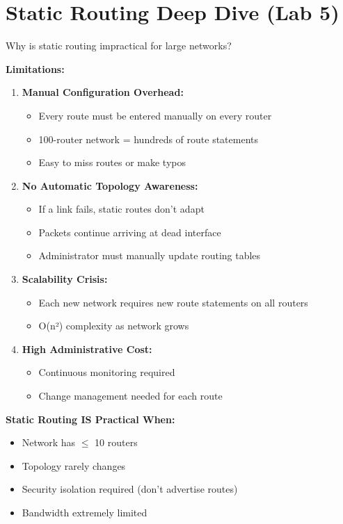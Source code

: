 \documentclass[12pt,a4paper]{article}
\begin{document}
\section{Static Routing Deep Dive (Lab 5)}

\begin{qbox}{Why is static routing impractical for large networks?}
\end{qbox}

\begin{abox}
\textbf{Limitations:}

\begin{enumerate}
    \item \textbf{Manual Configuration Overhead:}
    \begin{itemize}
        \item Every route must be entered manually on every router
        \item 100-router network = hundreds of route statements
        \item Easy to miss routes or make typos
    \end{itemize}

    \item \textbf{No Automatic Topology Awareness:}
    \begin{itemize}
        \item If a link fails, static routes don't adapt
        \item Packets continue arriving at dead interface
        \item Administrator must manually update routing tables
    \end{itemize}

    \item \textbf{Scalability Crisis:}
    \begin{itemize}
        \item Each new network requires new route statements on all routers
        \item O(n²) complexity as network grows
    \end{itemize}

    \item \textbf{High Administrative Cost:}
    \begin{itemize}
        \item Continuous monitoring required
        \item Change management needed for each route
    \end{itemize}
\end{enumerate}

\textbf{Static Routing IS Practical When:}
\begin{itemize}[noitemsep]
    \item Network has $\leq$ 10 routers
    \item Topology rarely changes
    \item Security isolation required (don't advertise routes)
    \item Bandwidth extremely limited
\end{itemize}
\end{abox}
\end{document}
